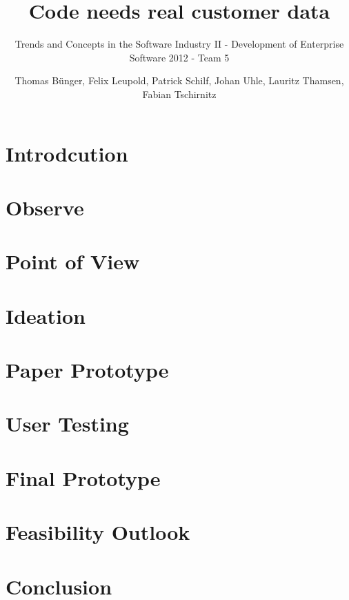 \documentclass[runningheads]{llncs}
\begin{document}
\title{Code needs real customer data}
\subtitle{Trends and Concepts in the Software Industry II - Development of Enterprise Software 2012 - Team 5}
\author{Thomas B\"unger, Felix Leupold, Patrick Schilf, Johan Uhle, Lauritz Thamsen, Fabian Tschirnitz}
\maketitle


\newpage


\section{Introdcution} %



\section{Observe}

\section{Point of View}

\section{Ideation}

\section{Paper Prototype}

\section{User Testing}

\section{Final Prototype}

\section{Feasibility Outlook}

\section{Conclusion}


%

\end{document}
